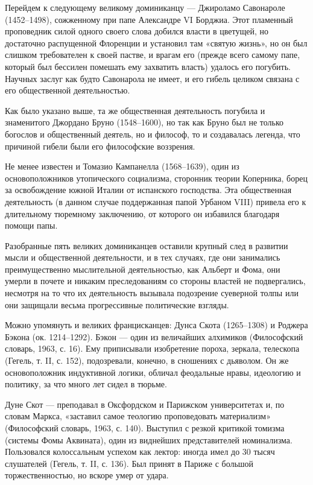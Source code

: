 Перейдем к следующему великому доминиканцу --- Джироламо Савонароле (1452--1498),
сожженному при папе Александре VI Борджиа. Этот пламенный проповедник силой
одного своего слова добился власти в цветущей, но достаточно распущенной
Флоренции и установил там «святую жизнь», но он был слишком требователен к
своей пастве, и врагам его (прежде всего самому папе, который был бессилен
помешать ему захватить власть) удалось его погубить. Научных заслуг как будто
Савонарола не имеет, и его гибель целиком связана с его общественной
деятельностью.

Как было указано выше, та же общественная деятельность погубила и знаменитого
Джордано Бруно (1548--1600), но так как Бруно был не только богослов и
общественный деятель, но и философ, то и создавалась легенда, что причиной
гибели были его философские воззрения.

Не менее известен и Томазио Кампанелла (1568--1639), один из основоположников
утопического социализма, сторонник теории Коперника, борец за освобождение
южной Италии от испанского господства. Эта общественная деятельность (в данном
случае поддержанная папой Урбаном VIII) привела его к длительному тюремному
заключению, от которого он избавился благодаря помощи папы.

Разобранные пять великих доминиканцев оставили крупный след в развитии мысли и
общественной деятельности, и в тех случаях, где они занимались преимущественно
мыслительной деятельностью, как Альберт и Фома, они умерли в почете и никаким
преследованиям со стороны властей не подвергались, несмотря на то что их
деятельность вызывала подозрение суеверной толпы или они защищали весьма
прогрессивные политические взгляды.

Можно упомянуть и великих францисканцев: Дунса Скота (1265--1308) и Роджера
Бэкона (ок. 1214--1292). Бэкон --- один из величайших алхимиков (Философский
словарь, 1963, с. 16). Ему приписывали изобретение пороха, зеркала, телескопа
(Гегель, т. II, с. 152), подозревали, конечно, в сношениях с дьяволом. Он же
основоположник индуктивной логики, обличал феодальные нравы, идеологию и
политику, за что много лет сидел в тюрьме.

Дуне Скот --- преподавал в Оксфордском и Парижском университетах и, по словам
Маркса, «заставил самое теологию проповедовать материализм» (Философский
словарь, 1963, с. 140). Выступил с резкой критикой томизма (системы Фомы
Аквината), один из виднейших представителей номинализма. Пользовался
колоссальным успехом как лектор: иногда имел до 30 тысяч слушателей (Гегель, т.
II, с. 136).
Был принят в Париже с большой торжественностью, но вскоре умер от удара.

